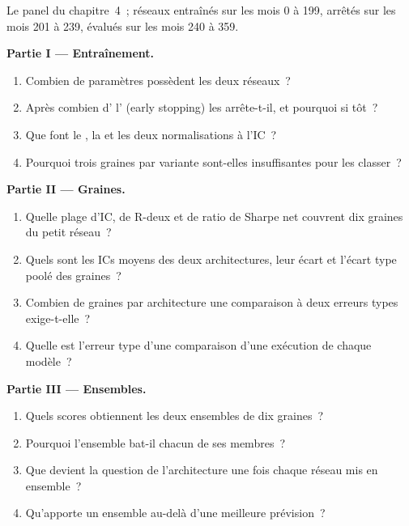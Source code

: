\begin{problem}\label{pb:ml:neural-networks-for-noisy-tabular-data:1}
Le panel du chapitre~4~; réseaux entraînés sur les mois 0 à 199, arrêtés sur les mois 201 à 239, évalués sur les mois 240 à 359.

\medskip\noindent\textbf{Partie I --- Entraînement.}
\begin{enumerate}
\item Combien de paramètres possèdent les deux réseaux~?
\item Après combien d' l' (early stopping) les arrête-t-il, et pourquoi si tôt~?
\item Que font le , la  et les deux normalisations à l'IC~?
\item Pourquoi trois graines par variante sont-elles insuffisantes pour les classer~?
\end{enumerate}

\medskip\noindent\textbf{Partie II --- Graines.}
\begin{enumerate}[resume]
\item Quelle plage d'IC, de R-deux et de ratio de Sharpe net couvrent dix graines du petit réseau~?
\item Quels sont les ICs moyens des deux architectures, leur écart et l'écart type poolé des graines~?
\item Combien de graines par architecture une comparaison à deux erreurs types exige-t-elle~?
\item Quelle est l'erreur type d'une comparaison d'une exécution de chaque modèle~?
\end{enumerate}

\medskip\noindent\textbf{Partie III --- Ensembles.}
\begin{enumerate}[resume]
\item Quels scores obtiennent les deux ensembles de dix graines~?
\item Pourquoi l'ensemble bat-il chacun de ses membres~?
\item Que devient la question de l'architecture une fois chaque réseau mis en ensemble~?
\item Qu'apporte un ensemble au-delà d'une meilleure prévision~?
\end{enumerate}


\end{problem}
